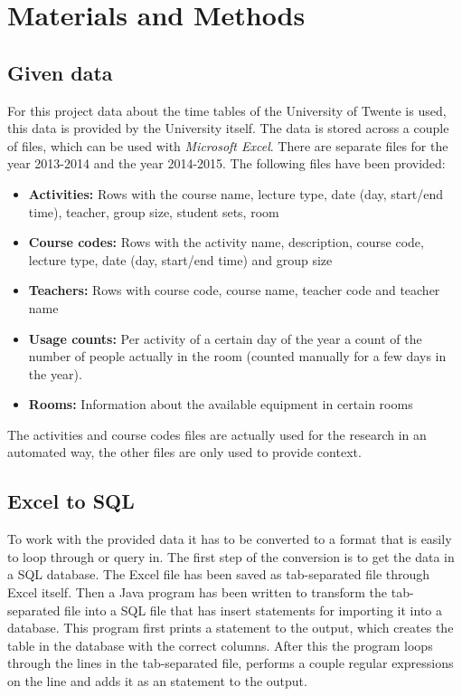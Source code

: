 \section{Materials and Methods}
\subsection{Given data}
For this project data about the time tables of the University of Twente is used, this data is provided by the University itself. The data is stored across a couple of  files, which can be used with \emph{Microsoft Excel}. There are separate files for the year 2013-2014 and the year 2014-2015. The following files have been provided:

\begin{itemize}
	\item \textbf{Activities:} Rows with the course name, lecture type, date (day, start/end time), teacher, group size, student sets, room
	\item \textbf{Course codes:} Rows with the activity name, description, course code, lecture type, date (day, start/end time) and group size
	\item \textbf{Teachers:} Rows with course code, course name, teacher code and teacher name
	\item \textbf{Usage counts:} Per activity of a certain day of the year a count of the number of people actually in the room (counted manually for a few days in the year).
	\item\textbf{Rooms:} Information about the available equipment in certain rooms
\end{itemize}

The activities and course codes files are actually used for the research in an automated way, the other files are only used to provide context.

\subsection{Excel to SQL}
To work with the provided data it has to be converted to a format that is easily to loop through or query in. The first step of the conversion is to get the data in a SQL database. The Excel file has been saved as tab-separated file through Excel itself. Then a Java program has been written to transform the tab-separated file into a SQL file that has insert statements for importing it into a database. This program first prints a  statement to the output, which creates the table in the database with the correct columns. After this the program loops through the lines in the tab-separated file, performs a couple regular expressions on the line and adds it as an  statement to the output.

